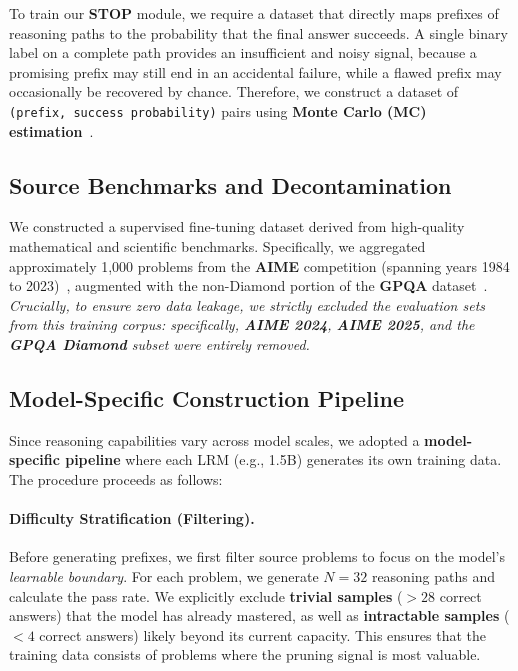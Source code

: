 \documentclass[11pt]{article}
\theoremstyle{plain}
\begin{document}
To train our \textbf{STOP} module, we require a dataset that directly maps prefixes of reasoning paths to the probability that the final answer succeeds. A single binary label on a complete path provides an insufficient and noisy signal, because a promising prefix may still end in an accidental failure, while a flawed prefix may occasionally be recovered by chance. Therefore, we construct a dataset of \texttt{(prefix, success probability)} pairs using \textbf{Monte Carlo (MC) estimation}~\cite{wang2024mathshepherd,zhao2025genprm}.

\subsection{Source Benchmarks and Decontamination}
We constructed a supervised fine-tuning dataset derived from high-quality mathematical and scientific benchmarks. Specifically, we aggregated approximately 1,000 problems from the \textbf{AIME} competition (spanning years 1984 to 2023)~\cite{maa2024aime,maa2025aime}, augmented with the non-Diamond portion of the \textbf{GPQA} dataset~\cite{rein2024gpqa}. 
\textit{Crucially, to ensure zero data leakage, we strictly excluded the evaluation sets from this training corpus: specifically, \textbf{AIME 2024}, \textbf{AIME 2025}, and the \textbf{GPQA Diamond} subset were entirely removed.}

\subsection{Model-Specific Construction Pipeline}
Since reasoning capabilities vary across model scales, we adopted a \textbf{model-specific pipeline} where each LRM (e.g., 1.5B) generates its own training data. The procedure proceeds as follows:

\paragraph{Difficulty Stratification (Filtering).}
Before generating prefixes, we first filter source problems to focus on the model's \textit{learnable boundary}. For each problem, we generate $N=32$ reasoning paths and calculate the pass rate. We explicitly exclude \textbf{trivial samples} ($>28$ correct answers) that the model has already mastered, as well as \textbf{intractable samples} ($<4$ correct answers) likely beyond its current capacity. This ensures that the training data consists of problems where the pruning signal is most valuable.
\end{document}
